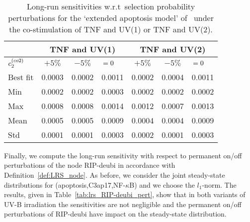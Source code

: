 \documentclass[runningheads,a4paper]{llncs}
\newcommand{\complex}[1]{{\fontfamily{lmss}\selectfont co#1}}
\newcommand{\node}[1]{{\fontfamily{lmss}\selectfont #1}}
\begin{document}
\begin{table}[!t]
\centering
\begin{tabular}{|l|c|c|c||c|c|c|}
\cline{2-7}
\multicolumn{1}{c|}{} & \multicolumn{3}{c||}{\node{TNF} and \node{UV(1)}} & \multicolumn{3}{c|}{\node{TNF} and \node{UV(2)}}\\
\hline
\hspace{2mm} $c_2^{(\complex{2})}$ \hspace{2mm} & \hspace{2mm} $+5\%$ \hspace{2mm} &
\hspace{2mm} $-5\%$ \hspace{2mm} & \hspace{4mm} $=0 \hspace{4mm}$ &
\hspace{2mm} $+5\%$ \hspace{2mm} & \hspace{2mm} $-5\%$ \hspace{2mm} &
\hspace{4mm} $=0 \hspace{4mm}$\\
\hline\hline
Best fit & 0.0003 & 0.0002 & 0.0011 & 0.0002 & 0.0004 & 0.0011\\
\hline
Min & 0.0002 & 0.0002 & 0.0003 & 0.0002 & 0.0002 & 0.0002\\
\hline
Max & 0.0008 & 0.0008 & 0.0014 & 0.0012 & 0.0007 & 0.0013\\
\hline
Mean & 0.0005 & 0.0005 & 0.0009 & 0.0004 & 0.0004 & 0.0009\\
\hline
Std & 0.0001 & 0.0001 & 0.0003 & 0.0002 & 0.0001 & 0.0003\\
\hline
\end{tabular}
\caption{Long-run sensitivities w.r.t\ selection probability perturbations for the `extended
apoptosis model' of~\cite{TMPTS14} under the co-stimulation of TNF and UV(1) or TNF and UV(2).}
\label{tab:lrs_complex2}
\end{table}



Finally, we compute the long-run sensitivity with respect to permanent on/off perturbations of the
node \node{RIP-deubi} in accordance with Definition~\ref{def:LRS_node}. As before, we consider the
joint steady-state distributions for (\node{apoptosis},\node{C3ap17},\node{NF-$\kappa$B}) and we
choose the $l_1$-norm. The results, given in Table~\ref{tab:lrs_RIP-deubi_pert}, show that in both
variants of UV-B irradiation the sensitivities are not negligible and the permanent on/off
perturbations of \node{RIP-deubi} have impact on the steady-state distribution.
\end{document}
